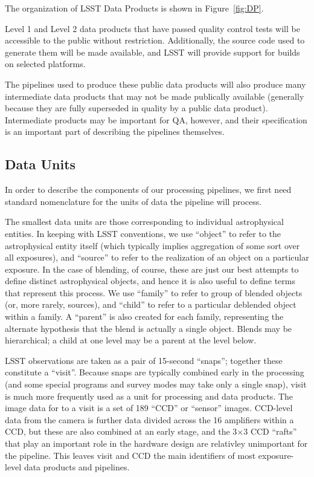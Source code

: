 The organization of LSST Data Products is shown in Figure~\ref{fig:DP}.

Level 1 and Level 2 data products that have passed quality control
tests will be accessible to the public without restriction.
Additionally, the source code used to generate them will be made
available, and LSST will provide support for builds on selected
platforms.

The pipelines used to produce these public data products will also produce many intermediate data products that may not be made publically available (generally because they are fully superseded in quality by a public data product).  Intermediate products may be important for QA, however, and their specification is an important part of describing the pipelines themselves.

\subsection{Data Units}

In order to describe the components of our processing pipelines, we first need standard nomenclature for the units of data the pipeline will process.

The smallest data units are those corresponding to individual astrophysical entities.  In keeping with LSST conventions, we use ``object'' to refer to the astrophysical entity itself (which typically implies aggregation of some sort over all exposures), and ``source'' to refer to the realization of an object on a particular exposure.  In the case of blending, of course, these are just our best attempts to define distinct astrophysical objects, and hence it is also useful to define terms that represent this process.  We use ``family'' to refer to group of blended objects (or, more rarely, sources), and ``child'' to refer to a particular deblended object within a family.  A ``parent'' is also created for each family, representing the alternate hypothesis that the blend is actually a single object.  Blends may be hierarchical; a child at one level may be a parent at the level below.

LSST observations are taken as a pair of 15-second ``snaps''; together these constitute a ``visit''.  Because snaps are typically combined early in the processing (and some special programs and survey modes may take only a single snap), visit is much more frequently used as a unit for processing and data products.  The image data for to a visit is a set of 189 ``CCD'' or ``sensor'' images.  CCD-level data from the camera is further data divided across the 16 amplifiers within a CCD, but these are also combined at an early stage, and the 3$\times$3 CCD ``rafts'' that play an important role in the hardware design are relativley unimportant for the pipeline.  This leaves visit and CCD the main identifiers of most exposure-level data products and pipelines.

